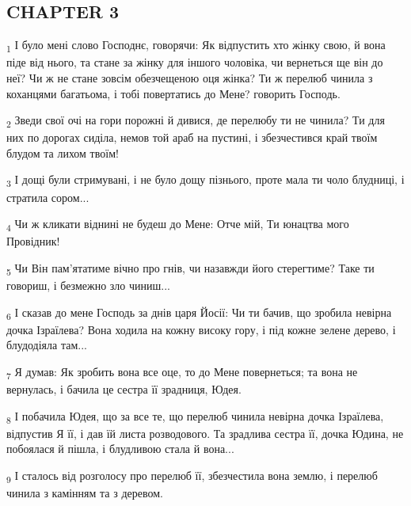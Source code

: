 \subsection{CHAPTER 3}
\begin{tcolorbox}
\textsubscript{1} І було мені слово Господнє, говорячи: Як відпустить хто жінку свою, й вона піде від нього, та стане за жінку для іншого чоловіка, чи вернеться ще він до неї? Чи ж не стане зовсім обезчещеною оця жінка? Ти ж перелюб чинила з коханцями багатьома, і тобі повертатись до Мене? говорить Господь.
\end{tcolorbox}
\begin{tcolorbox}
\textsubscript{2} Зведи свої очі на гори порожні й дивися, де перелюбу ти не чинила? Ти для них по дорогах сиділа, немов той араб на пустині, і збезчестився край твоїм блудом та лихом твоїм!
\end{tcolorbox}
\begin{tcolorbox}
\textsubscript{3} І дощі були стримувані, і не було дощу пізнього, проте мала ти чоло блудниці, і стратила сором...
\end{tcolorbox}
\begin{tcolorbox}
\textsubscript{4} Чи ж кликати віднині не будеш до Мене: Отче мій, Ти юнацтва мого Провідник!
\end{tcolorbox}
\begin{tcolorbox}
\textsubscript{5} Чи Він пам'ятатиме вічно про гнів, чи назавжди його стерегтиме? Таке ти говориш, і безмежно зло чиниш...
\end{tcolorbox}
\begin{tcolorbox}
\textsubscript{6} І сказав до мене Господь за днів царя Йосії: Чи ти бачив, що зробила невірна дочка Ізраїлева? Вона ходила на кожну високу гору, і під кожне зелене дерево, і блудодіяла там...
\end{tcolorbox}
\begin{tcolorbox}
\textsubscript{7} Я думав: Як зробить вона все оце, то до Мене повернеться; та вона не вернулась, і бачила це сестра її зрадниця, Юдея.
\end{tcolorbox}
\begin{tcolorbox}
\textsubscript{8} І побачила Юдея, що за все те, що перелюб чинила невірна дочка Ізраїлева, відпустив Я її, і дав їй листа розводового. Та зрадлива сестра її, дочка Юдина, не побоялася й пішла, і блудливою стала й вона...
\end{tcolorbox}
\begin{tcolorbox}
\textsubscript{9} І сталось від розголосу про перелюб її, збезчестила вона землю, і перелюб чинила з камінням та з деревом.
\end{tcolorbox}

